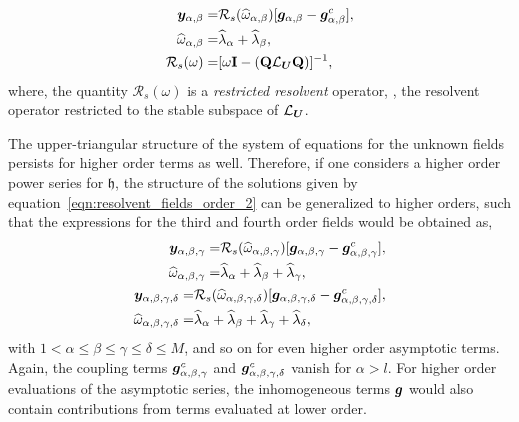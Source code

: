 	\begin{align}
	\label{eqn:resolvent_fields_order_2}
	\begin{split}
		\boldsymbol{y}_{\alpha,\beta} =&  \mathcal{R}_{s}(\widehat{\omega}_{\alpha,\beta})[\boldsymbol{g}_{\alpha,\beta} - \boldsymbol{g}^{c}_{\alpha,\beta}], \\
		\widehat{\omega}_{\alpha,\beta} =& \widehat{\lambda}_{\alpha} + \widehat{\lambda}_{\beta}, \\
		\mathcal{R}_{s}(\omega) =& [\omega\mathbf{I} 
		- (\mathbf{Q}\mathcal{L}_{\boldsymbol{U}}\mathbf{Q})]^{-1},
	\end{split}
\end{align}
where, the quantity $\mathcal{R}_{s}(\omega)$ is a \emph{restricted resolvent} operator, \ie, the resolvent operator restricted to the stable subspace of $\mathcal{L}_{\boldsymbol{U}}$. 

The upper-triangular structure of the system of equations for the unknown fields persists for higher order terms as well. Therefore, if one considers a higher order power series for $\mathfrak{h}$, the structure of the solutions given by equation~\eqref{eqn:resolvent_fields_order_2} can be generalized to higher orders, such that the expressions for the third and fourth order fields would be obtained as,
\begin{subequations}
	\label{eqn:resolvent_fields_higher_order}
	\begin{align}
		\label{eqn:resolvent_fields_order_3}
		\begin{split}
			\boldsymbol{y}_{\alpha,\beta,\gamma} =&  	\mathcal{R}_{s}(\widehat{\omega}_{\alpha,\beta,\gamma})[\boldsymbol{g}_{\alpha,\beta,\gamma} - \boldsymbol{g}^{c}_{\alpha,\beta,\gamma}], \\
			\widehat{\omega}_{\alpha,\beta,\gamma} =& \widehat{\lambda}_{\alpha} + 	\widehat{\lambda}_{\beta} + \widehat{\lambda}_{\gamma},
		\end{split}  \\ 
		\label{eqn:resolvent_fields_order_4}
		\begin{split}
			\boldsymbol{y}_{\alpha,\beta,\gamma,\delta} =&  	\mathcal{R}_{s}(\widehat{\omega}_{\alpha,\beta,\gamma,\delta})[\boldsymbol{g}_{\alpha,\beta,\gamma,\delta} - \boldsymbol{g}^{c}_{\alpha,\beta,\gamma,\delta}], \\
			\widehat{\omega}_{\alpha,\beta,\gamma,\delta} =& \widehat{\lambda}_{\alpha} + 	\widehat{\lambda}_{\beta} + \widehat{\lambda}_{\gamma} + \widehat{\lambda}_{\delta},
		\end{split}
	\end{align}
\end{subequations}
with $1<\alpha\le\beta\le\gamma\le\delta\le M$, and so on for even higher order asymptotic terms. Again, the coupling terms $\boldsymbol{g}^{c}_{\alpha,\beta,\gamma}$ and $\boldsymbol{g}^{c}_{\alpha,\beta,\gamma,\delta}$ vanish for $\alpha > l$. For higher order evaluations of the asymptotic series, the inhomogeneous terms $\boldsymbol{g}$ would also contain contributions from terms evaluated at lower order. 

